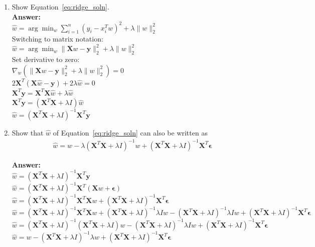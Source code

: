 \documentclass{article}
\newcommand{\1}{\mathbf{1}}
\newcommand{\mb}[1]{\mathbf{#1}}
\begin{document}
\begin{enumerate}
    \item Show Equation~\eqref{eq:ridge_soln}.\\
    
    \textbf{Answer:}\\
    
    $\widehat{w} = \arg\min_w \sum_{i=1}^n (y_i - x_i^T w)^2 + \lambda \| w \|_2^2$\\
    
    Switching to matrix notation:\\
    $\widehat{w} = \arg\min_w \| \mb X w-\mb y\| _2^2+ \lambda \| w \|_2^2$\\
    
    Set derivative to zero:\\
    $\nabla_w (\| \mb X w-\mb y \| _2^2+ \lambda \| w \|_2^2)=0$\\
    $2 \mb X^T(\mb X \widehat{w}  -\mb y)+ 2 \lambda \widehat{w} =0$\\
    $ \mb X^T \mb y= \mb X^T \mb X \widehat{w}  + \lambda \widehat{w} $\\
    $ \mb X^T \mb y= (\mb X^T \mb X + \lambda  I)\widehat{w} $\\
    $ \widehat{w}= (\mb X^T \mb X + \lambda I)^{-1} \mb X^T \mb y $\\
    
    \item Show that $\widehat{w}$ of Equation~\ref{eq:ridge_soln} can also be written as 
    \begin{align*}
        \widehat{w} = w - \lambda (\mb{X}^T \mb{X}+\lambda I)^{-1} w + (\mb{X}^T \mb{X}+\lambda I)^{-1} \mb{X}^T \boldsymbol{\epsilon}
    \end{align*}
    
    \textbf{Answer:}\\    
    
    $ \widehat{w}= (\mb X^T \mb X + \lambda I)^{-1} \mb X^T \mb y $\\    
    $ \widehat{w}= (\mb X^T \mb X + \lambda I)^{-1} \mb X^T (\mb X w+ \boldsymbol{\epsilon}) $\\    
    $ \widehat{w}= (\mb X^T \mb X + \lambda I)^{-1} \mb X^T \mb X w+ (\mb X^T \mb X + \lambda I)^{-1} \mb X^T \boldsymbol{\epsilon} $\\
    $ \widehat{w}= (\mb X^T \mb X + \lambda I)^{-1} \mb X^T \mb X w+ (\mb X^T \mb X + \lambda I)^{-1} \lambda I  w - (\mb X^T \mb X + \lambda I)^{-1} \lambda I w+ (\mb X^T \mb X + \lambda I)^{-1} \mb X^T \boldsymbol{\epsilon}$\\ 
    $ \widehat{w}= (\mb X^T \mb X + \lambda I)^{-1} (\mb X^T \mb X + \lambda I) w - (\mb X^T \mb X + \lambda I)^{-1} \lambda I w+ (\mb X^T \mb X + \lambda I)^{-1} \mb X^T \boldsymbol{\epsilon}$\\
    $ \widehat{w}= w - (\mb X^T \mb X + \lambda I)^{-1} \lambda w+ (\mb X^T \mb X + \lambda I)^{-1} \mb X^T \boldsymbol{\epsilon}$\\
    

\end{enumerate}
\end{document}

